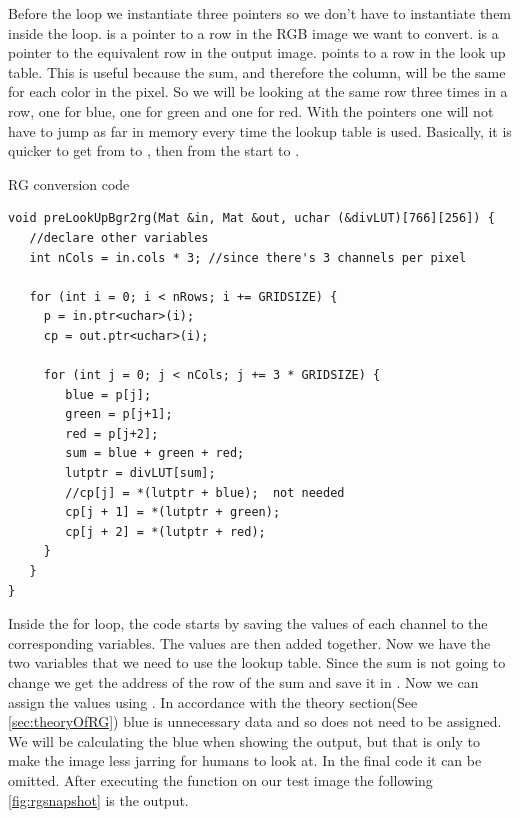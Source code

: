 Before the loop we instantiate three pointers so we don't have to instantiate them inside the loop.  is a pointer to a row in the RGB image we want to convert.  is a pointer to the equivalent row in the output image.  points to a row in the look up table. This is useful because the sum, and therefore the column, will be the same for each color in the pixel. So we will be looking at the same row three times in a row, one for blue, one for green and one for red. With the pointers one will not have to jump as far in memory every time the lookup table is used. Basically, it is quicker to get from  to , then from the start to . 
\begin{listing}[H]
	\caption{RG conversion code}
	\label{listing:sum}
	\begin{verbatim}
void preLookUpBgr2rg(Mat &in, Mat &out, uchar (&divLUT)[766][256]) {
   //declare other variables
   int nCols = in.cols * 3;	//since there's 3 channels per pixel
	
   for (int i = 0; i < nRows; i += GRIDSIZE) {
     p = in.ptr<uchar>(i);
	 cp = out.ptr<uchar>(i);
	
	 for (int j = 0; j < nCols; j += 3 * GRIDSIZE) {
	    blue = p[j];
		green = p[j+1];
		red = p[j+2];
		sum = blue + green + red;
		lutptr = divLUT[sum];
		//cp[j] = *(lutptr + blue);  not needed
		cp[j + 1] = *(lutptr + green);
		cp[j + 2] = *(lutptr + red);
	 }
   }
}
	\end{verbatim}
\end{listing}
Inside the for loop, the code starts by saving the values of each channel to the corresponding variables. The values are then added together. Now we have the two variables that we need to use the lookup table. Since the sum is not going to change we get the address of the row of the sum and save it in . Now we can assign the values using . In accordance with the theory section(See \autoref{sec:theoryOfRG}) blue is unnecessary data and so does not need to be assigned. We will be calculating the blue when showing the output, but that is only to make the image less jarring for humans to look at. In the final code it can be omitted. After executing the function on our test image the following \autoref{fig:rgsnapshot} is the output.
